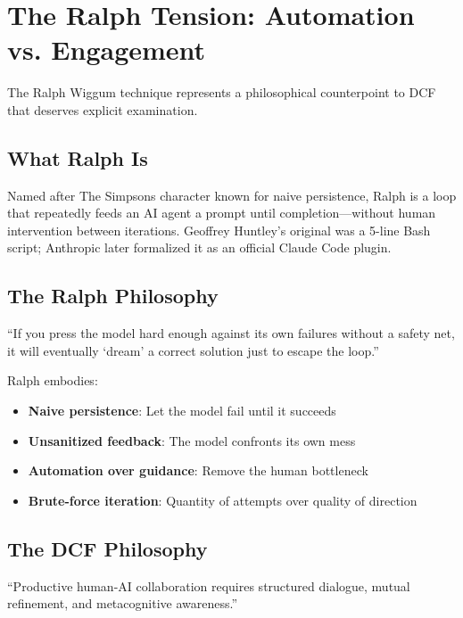 \chapter{The Ralph Tension: Automation vs. Engagement}

The Ralph Wiggum technique represents a philosophical counterpoint to DCF that deserves explicit examination.

\section{What Ralph Is}

Named after The Simpsons character known for naive persistence, Ralph is a loop that repeatedly feeds an AI agent a prompt until completion---without human intervention between iterations. Geoffrey Huntley's original was a 5-line Bash script; Anthropic later formalized it as an official Claude Code plugin.

\section{The Ralph Philosophy}

\begin{quotebox}
``If you press the model hard enough against its own failures without a safety net, it will eventually `dream' a correct solution just to escape the loop.''
\end{quotebox}

Ralph embodies:
\begin{itemize}
    \item \textbf{Naive persistence}: Let the model fail until it succeeds
    \item \textbf{Unsanitized feedback}: The model confronts its own mess
    \item \textbf{Automation over guidance}: Remove the human bottleneck
    \item \textbf{Brute-force iteration}: Quantity of attempts over quality of direction
\end{itemize}

\section{The DCF Philosophy}

\begin{quotebox}
``Productive human-AI collaboration requires structured dialogue, mutual refinement, and metacognitive awareness.''
\end{quotebox}


